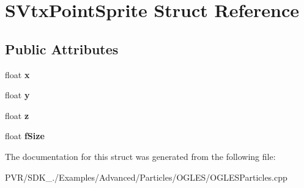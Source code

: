 \hypertarget{struct_s_vtx_point_sprite}{\section{S\+Vtx\+Point\+Sprite Struct Reference}
\label{struct_s_vtx_point_sprite}
}
\subsection*{Public Attributes}
\begin{DoxyCompactItemize}
\item 
\hypertarget{struct_s_vtx_point_sprite_aec582693fea310d689343c8c2fca8131}{float {\bfseries x}}\label{struct_s_vtx_point_sprite_aec582693fea310d689343c8c2fca8131}

\item 
\hypertarget{struct_s_vtx_point_sprite_a9f064d5c5a6c9f0245877b309fb3ad9d}{float {\bfseries y}}\label{struct_s_vtx_point_sprite_a9f064d5c5a6c9f0245877b309fb3ad9d}

\item 
\hypertarget{struct_s_vtx_point_sprite_a6ae3a051f71d8afa089a1a2e85a94567}{float {\bfseries z}}\label{struct_s_vtx_point_sprite_a6ae3a051f71d8afa089a1a2e85a94567}

\item 
\hypertarget{struct_s_vtx_point_sprite_a15490f667a6bd099edd2a3705016da22}{float {\bfseries f\+Size}}\label{struct_s_vtx_point_sprite_a15490f667a6bd099edd2a3705016da22}

\end{DoxyCompactItemize}


The documentation for this struct was generated from the following file\+:\begin{DoxyCompactItemize}
\item 
P\+V\+R/\+S\+D\+K\+\_./\+Examples/\+Advanced/\+Particles/\+O\+G\+L\+E\+S/O\+G\+L\+E\+S\+Particles.\+cpp\end{DoxyCompactItemize}
